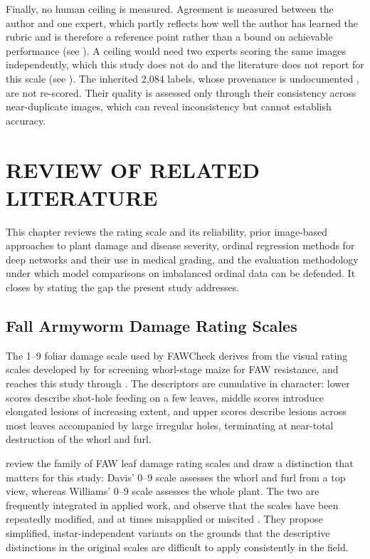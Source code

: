 \documentclass{icsthesis}
\newcommand{\secref}[1]{\textit{\nameref{#1}}}
\begin{document}
\begin{mainmatter}
				Finally, no human ceiling is measured. Agreement is measured between the author and
				one expert, which partly reflects how well the author has learned the rubric and is
				therefore a reference point rather than a bound on achievable performance (see
				\secref{sec:annotation}). A ceiling would need two experts scoring the same images
				independently, which this study does not do and the literature does not report for
				this scale (see \secref{sec:observer}). The inherited 2,084 labels, whose provenance is
				undocumented \citep{casasola2026}, are not re-scored. Their quality is assessed only
				through their consistency across near-duplicate images, which can reveal
				inconsistency but cannot establish accuracy.

		\section{REVIEW OF RELATED LITERATURE}\label{sec:rrl}

			This chapter reviews the rating scale and its reliability, prior image-based approaches
			to plant damage and disease severity, ordinal regression methods for deep networks and
			their use in medical grading, and the evaluation methodology under which model
			comparisons on imbalanced ordinal data can be defended. It closes by stating the gap the
			present study addresses.

			\subsection{Fall Armyworm Damage Rating Scales}\label{sec:scales}

				The 1--9 foliar damage scale used by FAWCheck derives from the visual rating scales
				developed by \citet{davis1992} for screening whorl-stage maize for FAW resistance,
				and reaches this study through \citet{prasanna2018}. The descriptors are cumulative
				in character: lower scores describe shot-hole feeding on a few leaves, middle scores
				introduce elongated lesions of increasing extent, and upper scores describe lesions
				across most leaves accompanied by large irregular holes, terminating at near-total
				destruction of the whorl and furl.

				\citet{toepfer2021} review the family of FAW leaf damage rating scales and draw a
				distinction that matters for this study: Davis' 0--9 scale assesses the whorl and
				furl from a top view, whereas Williams' 0--9 scale assesses the whole plant. The two
				are frequently integrated in applied work, and \citeauthor{toepfer2021} observe that
				the scales have been repeatedly modified, and at times misapplied or miscited
				\citep{toepfer2021}. They propose simplified,
				instar-independent variants on the grounds that the descriptive distinctions in the
				original scales are difficult to apply consistently in the field.


\end{mainmatter}
\end{document}
